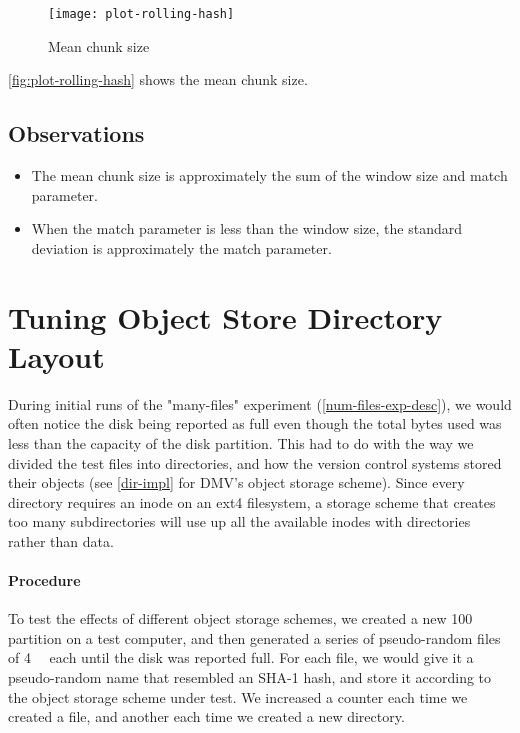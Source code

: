 \begin{figure}[]
  \caption{Mean chunk size}
  \label{fig:plot-rolling-hash}
  \centering
    \texttt{[image: plot-rolling-hash]}
\end{figure}

\autoref{fig:plot-rolling-hash} shows the mean chunk size.

\subsection{Observations}

\begin{itemize}

  \item The mean chunk size is approximately the sum of the window size and
    match parameter.

  \item When the match parameter is less than the window size, the standard
    deviation is approximately the match parameter.

\end{itemize}


%


\section{Tuning Object Store Directory Layout}\label{dir-experiment}

During initial runs of the "many-files" experiment
(\autoref{num-files-exp-desc}), we would often notice the disk being reported as
full even though the total bytes used was less than the capacity of the disk
partition. This had to do with the way we divided the test files into
directories, and how the version control systems stored their objects (see
\autoref{dir-impl} for DMV's object storage scheme). Since every directory
requires an inode on an ext4 filesystem, a storage scheme that creates too many
subdirectories will use up all the available inodes with directories rather than
data.


\paragraph{Procedure}

To test the effects of different object storage schemes, we created a new
\SI{100}{\mebi\byte} partition on a test computer, and then generated a series
of pseudo-random files of \SI{4}{\kibi\byte} each until the disk was reported
full. For each file, we would give it a pseudo-random name that resembled an
SHA-1 hash, and store it according to the object storage scheme under test. We
increased a counter each time we created a file, and another each time we
created a new directory.

